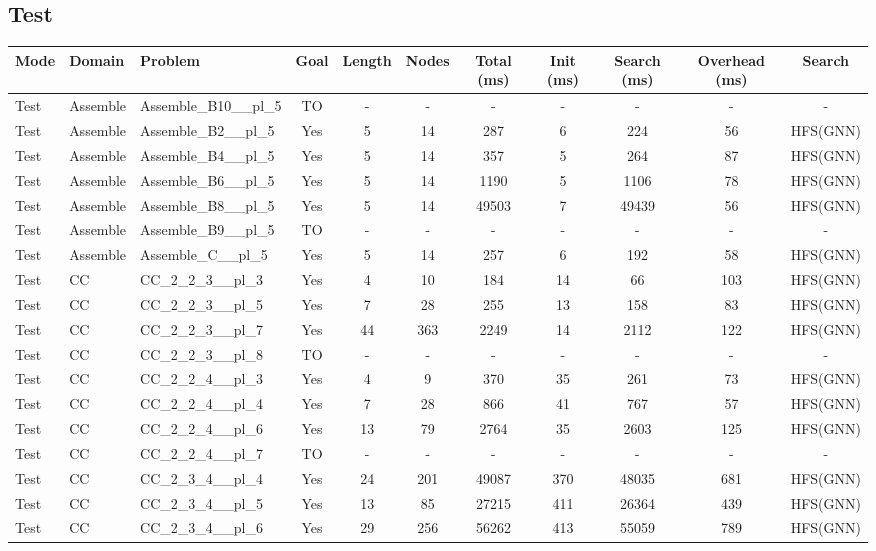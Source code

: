 \documentclass{article}
\begin{document}
\subsection*{Test}
\begin{tabular}{lllcccccccc}
\toprule
Mode & Domain & Problem & Goal & Length & Nodes & Total (ms) & Init (ms) & Search (ms) & Overhead (ms) & Search \\
\midrule
Test & Assemble & Assemble\_B10\_\_pl\_5 & TO & - & - & - & - & - & - & - \\
Test & Assemble & Assemble\_B2\_\_pl\_5 & Yes & 5 & 14 & 287 & 6 & 224 & 56 & HFS(GNN) \\
Test & Assemble & Assemble\_B4\_\_pl\_5 & Yes & 5 & 14 & 357 & 5 & 264 & 87 & HFS(GNN) \\
Test & Assemble & Assemble\_B6\_\_pl\_5 & Yes & 5 & 14 & 1190 & 5 & 1106 & 78 & HFS(GNN) \\
Test & Assemble & Assemble\_B8\_\_pl\_5 & Yes & 5 & 14 & 49503 & 7 & 49439 & 56 & HFS(GNN) \\
Test & Assemble & Assemble\_B9\_\_pl\_5 & TO & - & - & - & - & - & - & - \\
Test & Assemble & Assemble\_C\_\_pl\_5 & Yes & 5 & 14 & 257 & 6 & 192 & 58 & HFS(GNN) \\
Test & CC & CC\_2\_2\_3\_\_pl\_3 & Yes & 4 & 10 & 184 & 14 & 66 & 103 & HFS(GNN) \\
Test & CC & CC\_2\_2\_3\_\_pl\_5 & Yes & 7 & 28 & 255 & 13 & 158 & 83 & HFS(GNN) \\
Test & CC & CC\_2\_2\_3\_\_pl\_7 & Yes & 44 & 363 & 2249 & 14 & 2112 & 122 & HFS(GNN) \\
Test & CC & CC\_2\_2\_3\_\_pl\_8 & TO & - & - & - & - & - & - & - \\
Test & CC & CC\_2\_2\_4\_\_pl\_3 & Yes & 4 & 9 & 370 & 35 & 261 & 73 & HFS(GNN) \\
Test & CC & CC\_2\_2\_4\_\_pl\_4 & Yes & 7 & 28 & 866 & 41 & 767 & 57 & HFS(GNN) \\
Test & CC & CC\_2\_2\_4\_\_pl\_6 & Yes & 13 & 79 & 2764 & 35 & 2603 & 125 & HFS(GNN) \\
Test & CC & CC\_2\_2\_4\_\_pl\_7 & TO & - & - & - & - & - & - & - \\
Test & CC & CC\_2\_3\_4\_\_pl\_4 & Yes & 24 & 201 & 49087 & 370 & 48035 & 681 & HFS(GNN) \\
Test & CC & CC\_2\_3\_4\_\_pl\_5 & Yes & 13 & 85 & 27215 & 411 & 26364 & 439 & HFS(GNN) \\
Test & CC & CC\_2\_3\_4\_\_pl\_6 & Yes & 29 & 256 & 56262 & 413 & 55059 & 789 & HFS(GNN) \\

\end{tabular}
\end{document}
